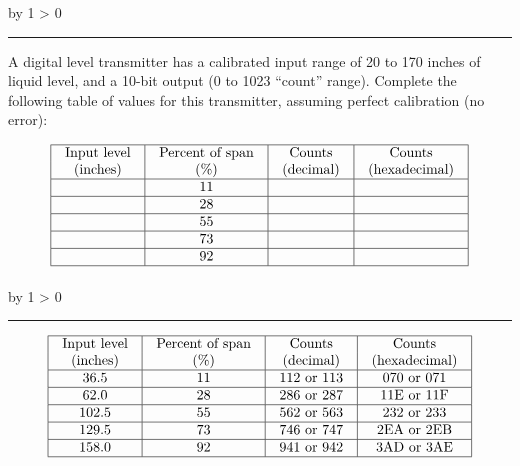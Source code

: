 \documentclass[12pt,a4paper]{article}
\def\oppgave{
            \advance\questnum by 1
            \ifnum \questnum > 0
                 \hrule
                 \vskip 3pt
                 \leftline{Oppgave \the\questnum}
                 \vskip 3pt \fi}
\def\svar{
           \advance\answnum by 1
           \ifnum \answnum > 0
                \hrule
                \vskip 3pt
                \leftline{Svar \the\answnum}
                \vskip 3pt \fi}
\begin{document}

\vfil \eject 



\oppgave{} 

A digital level transmitter has a calibrated input range of 20 to 170 inches of liquid level, and a 10-bit output (0 to 1023 ``count'' range).  Complete the following table of values for this transmitter, assuming perfect calibration (no error):


$$\vbox{\offinterlineskip
\halign{\strut
\vrule \quad\hfil # \ \hfil & 
\vrule \quad\hfil # \ \hfil & 
\vrule \quad\hfil # \ \hfil & 
\vrule \quad\hfil # \ \hfil \vrule \cr
\noalign{\hrule}
%
Input level & Percent of span & Counts & Counts \cr
%
(inches) & (\%) & (decimal) & (hexadecimal) \cr
%
\noalign{\hrule}
%
 & 11 &  &  \cr
%
\noalign{\hrule}
%
 & 28 &  &  \cr
%
\noalign{\hrule}
%
 & 55 &  &  \cr
%
\noalign{\hrule}
%
 & 73 &  &  \cr
%
\noalign{\hrule}
%
 & 92 &  &  \cr
%
\noalign{\hrule}
} %
}$$ %

\vskip 10pt \filbreak 





\svar{} 


$$\vbox{\offinterlineskip
\halign{\strut
\vrule \quad\hfil # \ \hfil & 
\vrule \quad\hfil # \ \hfil & 
\vrule \quad\hfil # \ \hfil & 
\vrule \quad\hfil # \ \hfil \vrule \cr
\noalign{\hrule}
%
Input level & Percent of span & Counts & Counts \cr
%
(inches) & (\%) & (decimal) & (hexadecimal) \cr
%
\noalign{\hrule}
%
36.5 & 11 & 112 or 113 & 070 or 071  \cr
%
\noalign{\hrule}
%
62.0 & 28 & 286 or 287 & 11E or 11F \cr
%
\noalign{\hrule}
%
102.5 & 55 & 562 or 563 & 232 or 233 \cr
%
\noalign{\hrule}
%
129.5 & 73 & 746 or 747 & 2EA or 2EB \cr
%
\noalign{\hrule}
%
158.0 & 92 & 941 or 942 & 3AD or 3AE \cr
%
\noalign{\hrule}
} %
}$$ %
\end{document}
